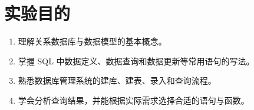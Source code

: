 \chapter{实验目的}

\begin{enumerate}
  \item 理解关系数据库与数据模型的基本概念。
  \item 掌握 SQL 中数据定义、数据查询和数据更新等常用语句的写法。
  \item 熟悉数据库管理系统的建库、建表、录入和查询流程。
  \item 学会分析查询结果，并能根据实际需求选择合适的语句与函数。
\end{enumerate}
